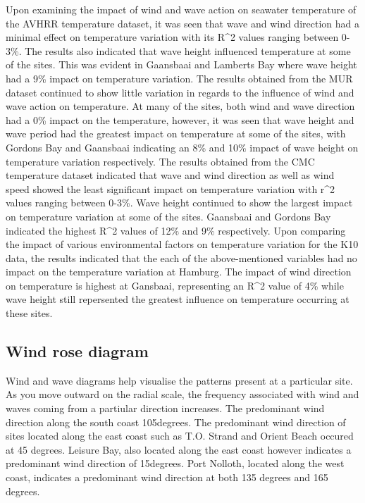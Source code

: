 \documentclass[12pt,A4paper,]{article}
\begin{document}
Upon examining the impact of wind and wave action on seawater
temperature of the AVHRR temperature dataset, it was seen that wave and
wind direction had a minimal effect on temperature variation with its
R\^{}2 values ranging between 0-3\%. The results also indicated that
wave height influenced temperature at some of the sites. This was
evident in Gaansbaai and Lamberts Bay where wave height had a 9\% impact
on temperature variation. The results obtained from the MUR dataset
continued to show little variation in regards to the influence of wind
and wave action on temperature. At many of the sites, both wind and wave
direction had a 0\% impact on the temperature, however, it was seen that
wave height and wave period had the greatest impact on temperature at
some of the sites, with Gordons Bay and Gaansbaai indicating an 8\% and
10\% impact of wave height on temperature variation respectively. The
results obtained from the CMC temperature dataset indicated that wave
and wind direction as well as wind speed showed the least significant
impact on temperature variation with r\^{}2 values ranging between
0-3\%. Wave height continued to show the largest impact on temperature
variation at some of the sites. Gaansbaai and Gordons Bay indicated the
highest R\^{}2 values of 12\% and 9\% respectively. Upon comparing the
impact of various environmental factors on temperature variation for the
K10 data, the results indicated that the each of the above-mentioned
variables had no impact on the temperature variation at Hamburg. The
impact of wind direction on temperature is highest at Gansbaai,
representing an R\^{}2 value of 4\% while wave height still repersented
the greatest influence on temperature occurring at these sites.

\subsection{Wind rose diagram}\label{wind-rose-diagram}

Wind and wave diagrams help visualise the patterns present at a
particular site. As you move outward on the radial scale, the frequency
associated with wind and waves coming from a partiular direction
increases. The predominant wind direction along the south coast
105degrees. The predominant wind direction of sites located along the
east coast such as T.O. Strand and Orient Beach occured at 45 degrees.
Leisure Bay, also located along the east coast however indicates a
predominant wind direction of 15degrees. Port Nolloth, located along the
west coast, indicates a predominant wind direction at both 135 degrees
and 165 degrees.
\end{document}
